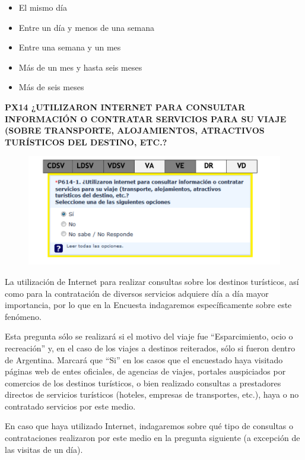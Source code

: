 \documentclass[
  openany]{book}
\begin{document}
\begin{itemize}
\item
  El mismo día
\item
  Entre un día y menos de una semana
\item
  Entre una semana y un mes
\item
  Más de un mes y hasta seis meses
\item
  Más de seis meses
\end{itemize}

\textbf{PX14 ¿UTILIZARON INTERNET PARA CONSULTAR INFORMACIÓN O CONTRATAR SERVICIOS PARA SU VIAJE (SOBRE TRANSPORTE, ALOJAMIENTOS, ATRACTIVOS TURÍSTICOS DEL DESTINO, ETC.?}

\begin{figure}

{\centering \includegraphics[width=1\linewidth]{imagenes/figura6-106} 

}

\end{figure}

La utilización de Internet para realizar consultas sobre los destinos turísticos, así como para la contratación de diversos servicios adquiere día a día mayor importancia, por lo que en la Encuesta indagaremos específicamente sobre este fenómeno.

Esta pregunta sólo se realizará si el motivo del viaje fue ``Esparcimiento, ocio o recreación'' y, en el caso de los viajes a destinos reiterados, sólo si fueron dentro de Argentina. Marcará que ``Si'' en los casos que el encuestado haya visitado páginas web de entes oficiales, de agencias de viajes, portales auspiciados por comercios de los destinos turísticos, o bien realizado consultas a prestadores directos de servicios turísticos (hoteles, empresas de transportes, etc.), haya o no contratado servicios por este medio.

En caso que haya utilizado Internet, indagaremos sobre qué tipo de consultas o contrataciones realizaron por este medio en la pregunta siguiente (a excepción de las visitas de un día).
\end{document}
